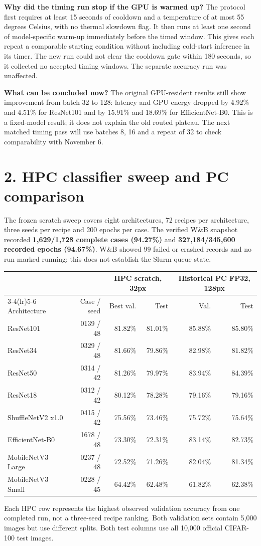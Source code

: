 \documentclass[10pt,a4paper]{article}
\newcommand{\heading}[1]{\section*{\color{navy}#1}}
\newcommand{\smallcap}[1]{{\footnotesize\color{navy}#1}\par}
\begin{document}
\textbf{Why did the timing run stop if the GPU is warmed up?}
The protocol first requires at least 15 seconds of cooldown and a temperature of at most 55 degrees Celsius, with no thermal slowdown flag. It then runs at least one second of model-specific warm-up immediately before the timed window. This gives each repeat a comparable starting condition without including cold-start inference in its timer. The new run could not clear the cooldown gate within 180 seconds, so it collected no accepted timing windows. The separate accuracy run was unaffected.

\textbf{What can be concluded now?}
The original GPU-resident results still show improvement from batch 32 to 128: latency and GPU energy dropped by 4.92\% and 4.51\% for ResNet101 and by 15.91\% and 18.69\% for EfficientNet-B0. This is a fixed-model result; it does not explain the old routed plateau. The next matched timing pass will use batches 8, 16 and a repeat of 32 to check comparability with November 6.
\fi

\newpage
\heading{2. HPC classifier sweep and PC comparison}
The frozen scratch sweep covers eight architectures, 72 recipes per architecture, three seeds per recipe and 200 epochs per case. The verified W\&B snapshot recorded \textbf{1,629/1,728 complete cases (94.27\%)} and \textbf{327,184/345,600 recorded epochs (94.67\%)}. W\&B showed 99 failed or crashed records and no run marked running; this does not establish the Slurm queue state.

\begin{center}\small
\begin{tabular}{@{}lrrrrr@{}}\toprule
 & & \multicolumn{2}{c}{HPC scratch, 32px} & \multicolumn{2}{c}{Historical PC FP32, 128px}\\
\cmidrule(lr){3-4}\cmidrule(lr){5-6}
Architecture & Case / seed & Best val. & Test & Val. & Test\\
\midrule
ResNet101             & 0139 / 48 & 81.82\% & 81.01\% & 85.88\% & 85.80\%\\
ResNet34              & 0329 / 48 & 81.66\% & 79.86\% & 82.98\% & 81.82\%\\
ResNet50              & 0314 / 42 & 81.26\% & 79.97\% & 83.94\% & 84.39\%\\
ResNet18              & 0312 / 42 & 80.12\% & 78.28\% & 79.16\% & 79.16\%\\
ShuffleNetV2 x1.0     & 0415 / 42 & 75.56\% & 73.46\% & 75.72\% & 75.64\%\\
EfficientNet-B0       & 1678 / 48 & 73.30\% & 72.31\% & 83.14\% & 82.73\%\\
MobileNetV3 Large     & 0237 / 48 & 72.52\% & 71.26\% & 82.04\% & 81.34\%\\
MobileNetV3 Small     & 0228 / 45 & 64.42\% & 62.48\% & 61.82\% & 62.38\%\\
\bottomrule\end{tabular}
\end{center}
\smallcap{Each HPC row represents the highest observed validation accuracy from one completed run, not a three-seed recipe ranking. Both validation sets contain 5,000 images but use different splits. Both test columns use all 10,000 official CIFAR-100 test images.}
\end{document}
